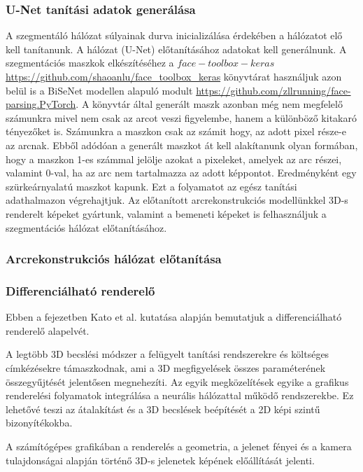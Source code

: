 \documentclass[12pt,a4]{article}
\begin{document}
    \subsubsection{U-Net tanítási adatok generálása}
    A szegmentáló hálózat súlyainak durva inicializálása érdekében a hálózatot elő kell tanítanunk. A hálózat (U-Net) előtanításához adatokat kell generálnunk. A szegmentációs maszkok elkészítéséhez a $face-toolbox-keras$ \url{https://github.com/shaoanlu/face_toolbox_keras} könyvtárat használjuk azon belül is a BiSeNet modellen alapuló modult \url{https://github.com/zllrunning/face-parsing.PyTorch}. A könyvtár által generált maszk azonban még nem megfelelő számunkra mivel nem csak az arcot veszi figyelembe, hanem a különböző kitakaró tényezőket is. Számunkra a maszkon csak az számit hogy, az adott pixel része-e az arcnak. Ebből adódóan a generált maszkot át kell alakítanunk olyan formában, hogy a maszkon 1-es számmal jelölje azokat a pixeleket, amelyek az arc részei, valamint 0-val, ha az arc nem tartalmazza az adott képpontot. Eredményként egy szürkeárnyalatú maszkot kapunk. Ezt a folyamatot az egész tanítási adathalmazon végrehajtjuk. 
    Az előtanított arcrekonstrukciós modellünkkel 3D-s renderelt képeket gyártunk, valamint a bemeneti képeket is felhasználjuk a szegmentációs hálózat előtanításához.
    

    \subsubsection{Arcrekonstrukciós hálózat előtanítása}
    
    \subsubsection{Differenciálható renderelő}

    Ebben a fejezetben Kato et al. \cite{diffrenderer} kutatása alapján bemutatjuk a differenciálható renderelő alapelvét.

    A legtöbb 3D becslési módszer a
felügyelt tanítási rendszerekre és költséges címkézésekre támaszkodnak, ami
a 3D megfigyelések összes paraméterének összegyűjtését jelentősen megnehezíti.
Az egyik
megközelítések egyike a grafikus renderelési folyamatok integrálása
a neurális hálózattal működő rendszerekbe. Ez lehetővé teszi az átalakítást és
a 3D becslések beépítését a 2D képi szintű bizonyítékokba.

A számítógépes grafikában a renderelés a geometria, a jelenet fényei és a kamera tulajdonságai alapján történő 3D-s jelenetek képének előállítását jelenti.
\end{document}
